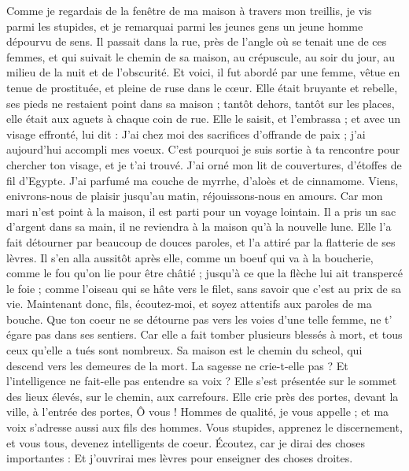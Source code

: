 \begin{multicols}{2}
Comme je regardais de la fenêtre de ma maison à travers mon treillis,
je vis parmi les stupides, et je remarquai parmi les jeunes gens un jeune homme dépourvu de sens.
Il passait dans la rue, près de l’angle où se tenait une de ces femmes, et qui suivait le chemin de sa maison,
au crépuscule, au soir du jour, au milieu de la nuit et de l’obscurité.
Et voici, il fut abordé par une femme, vêtue en tenue de prostituée, et pleine de ruse dans le cœur.
Elle était bruyante et rebelle, ses pieds ne restaient point dans sa maison ;
tantôt dehors, tantôt sur les places, elle était aux aguets à chaque coin de rue.
Elle le saisit, et l’embrassa ; et avec un visage effronté, lui dit :
J’ai chez moi des sacrifices d'offrande de paix ; j'ai aujourd'hui accompli mes voeux.
C’est pourquoi je suis sortie à ta rencontre pour chercher ton visage, et je t’ai trouvé.
J'ai orné mon lit de couvertures, d’étoffes de fil d'Egypte.
J’ai parfumé ma couche de myrrhe, d'aloès et de cinnamome.
Viens, enivrons-nous de plaisir jusqu'au matin, réjouissons-nous en amours.
Car mon mari n'est point à la maison, il est parti pour un voyage lointain.
Il a pris un sac d'argent dans sa main, il ne reviendra à la maison qu'à la nouvelle lune.
Elle l'a fait détourner par beaucoup de douces paroles, et l'a attiré par la flatterie de ses lèvres.
Il s’en alla aussitôt après elle, comme un boeuf qui va à la boucherie, comme le fou qu’on lie pour être châtié ;
jusqu'à ce que la flèche lui ait transpercé le foie ; comme l'oiseau qui se hâte vers le filet, sans savoir que c’est au prix de sa vie.
Maintenant donc, fils, écoutez-moi, et soyez attentifs aux paroles de ma bouche.
Que ton coeur ne se détourne pas vers les voies d’une telle femme, ne t' égare pas dans ses sentiers.
Car elle a fait tomber plusieurs blessés à mort, et tous ceux qu'elle a tués sont nombreux.
Sa maison est le chemin du scheol, qui descend vers les demeures de la mort.
\TextTitle{[La sagesse]}
\VerseOne{}La sagesse ne crie-t-elle pas ? Et l'intelligence ne fait-elle pas entendre sa voix ?
Elle s'est présentée sur le sommet des lieux élevés, sur le chemin, aux carrefours.
Elle crie près des portes, devant la ville, à l'entrée des portes,
Ô vous ! Hommes de qualité, je vous appelle ; et ma voix s'adresse aussi aux fils des hommes.
Vous stupides, apprenez le discernement, et vous tous, devenez intelligents de coeur.
Écoutez, car je dirai des choses importantes : Et j'ouvrirai mes lèvres pour enseigner des choses droites.

\end{multicols}
